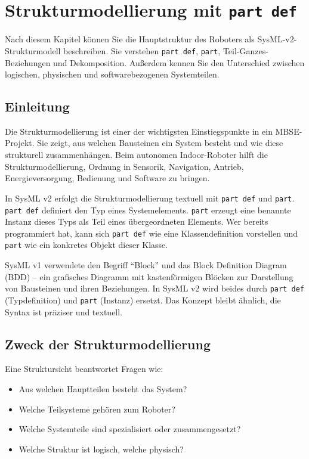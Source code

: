 \chapter{Strukturmodellierung mit \texttt{part def}}

\begin{lernziele}
Nach diesem Kapitel können Sie die Hauptstruktur des Roboters als SysML-v2-Strukturmodell beschreiben. Sie verstehen \texttt{part def}, \texttt{part}, Teil-Ganzes-Beziehungen und Dekomposition. Außerdem kennen Sie den Unterschied zwischen logischen, physischen und softwarebezogenen Systemteilen.
\end{lernziele}

\section{Einleitung}
Die Strukturmodellierung ist einer der wichtigsten Einstiegspunkte in ein MBSE-Projekt. Sie zeigt, aus welchen Bausteinen ein System besteht und wie diese strukturell zusammenhängen. Beim autonomen Indoor-Roboter hilft die Strukturmodellierung, Ordnung in Sensorik, Navigation, Antrieb, Energieversorgung, Bedienung und Software zu bringen.

In SysML v2 erfolgt die Strukturmodellierung textuell mit \texttt{part def} und \texttt{part}. \texttt{part def} definiert den Typ eines Systemelements. \texttt{part} erzeugt eine benannte Instanz dieses Typs als Teil eines übergeordneten Elements. Wer bereits programmiert hat, kann sich \texttt{part def} wie eine Klassendefinition vorstellen und \texttt{part} wie ein konkretes Objekt dieser Klasse.

\begin{hinweisbox}
SysML v1 verwendete den Begriff \enquote{Block} und das Block Definition Diagram (BDD) – ein grafisches Diagramm mit kastenförmigen Blöcken zur Darstellung von Bausteinen und ihren Beziehungen. In SysML v2 wird beides durch \texttt{part def} (Typdefinition) und \texttt{part} (Instanz) ersetzt. Das Konzept bleibt ähnlich, die Syntax ist präziser und textuell.
\end{hinweisbox}

\section{Zweck der Strukturmodellierung}
Eine Struktursicht beantwortet Fragen wie:

\begin{itemize}
    \item Aus welchen Hauptteilen besteht das System?
    \item Welche Teilsysteme gehören zum Roboter?
    \item Welche Systemteile sind spezialisiert oder zusammengesetzt?
    \item Welche Struktur ist logisch, welche physisch?
\end{itemize}

